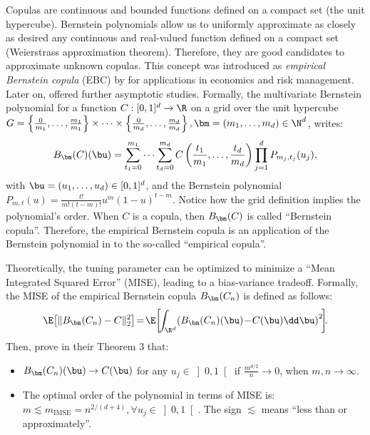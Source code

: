 Copulas are continuous and bounded functions defined on a compact set (the unit hypercube). 
Bernstein polynomials allow us to uniformly approximate as closely as desired any continuous and real-valued function defined on a compact set (Weierstrass approximation theorem). 
Therefore, they are good candidates to approximate unknown copulas. 
This concept was introduced as \emph{empirical Bernstein copula} (EBC) by \cite{sancetta_satchell_2004} for applications in economics and risk management. 
Later on, \cite{segers_2017} offered further asymptotic studies. 
Formally, the multivariate Bernstein polynomial for a function $C: [0, 1]^d \rightarrow \R$ on a grid over the unit hypercube $G=\left\{\frac{0}{m_1}, \dots, \frac{m_1}{m_1}\right\} \times \dots \times \left\{\frac{0}{m_d}, \dots, \frac{m_d}{m_d}\right\}, \bm = (m_1, \dots, m_d) \in \N^d$, writes: 
\begin{equation}
    B_{\bm}(C)(\bu) = \sum_{t_1=0}^{m_1} \dots \sum_{t_d=0}^{m_d} C\left(\frac{t_1}{m_1}, \dots, \frac{t_d}{m_d}\right) \prod_{j=1}^d P_{m_j, t_j}(u_j),\label{eq:ebc}
\end{equation}
with $\bu = (u_1, \dots, u_d) \in [0, 1]^d$, and the Bernstein polynomial $P_{m, t}(u)= \frac{t!}{m!(t-m)!}u^m(1-u)^{t-m}$. 
Notice how the grid definition implies the polynomial's order. 
When $C$ is a copula, then $B_{\bm}(C)$ is called ``Bernstein copula''. 
Therefore, the empirical Bernstein copula is an application of the Bernstein polynomial in  to the so-called ``empirical copula''.

Theoretically, the tuning parameter can be optimized to minimize a ``Mean Integrated Squared Error'' (MISE), leading to a bias-variance tradeoff. 
Formally, the MISE of the empirical Bernstein copula $B_{\bm}(C_n)$ is defined as follows:
\begin{equation}
    \E\!\left[ \lVert B_{\bm}(C_n) - C \rVert^2_2 \right] \!=\! \E\!\left[\!\int_{\R^d}\! \left(B_{\bm}(C_n)(\bu) \!-\! C(\bu) \dd \bu \right)^2 \!\right]\!\!.
    \label{eq:kimse}
\end{equation}
Then, \cite{sancetta_satchell_2004} prove in their Theorem 3 that: 
\begin{itemize}
    \item $B_{\bm}(C_n)(\bu) \rightarrow C(\bu)$ for any $u_j \in \left]0, 1\right[$ if $\frac{m^{d/2}}{n} \rightarrow 0$, when $m, n \rightarrow \infty$.
    \item The optimal order of the polynomial in terms of MISE is: $m \lesssim m_{\mathrm{IMSE}} = n^{2/(d+4)}, \forall u_j \in \left]0, 1\right[$. The sign $\lesssim$ means ``less than or approximately''.
\end{itemize}

